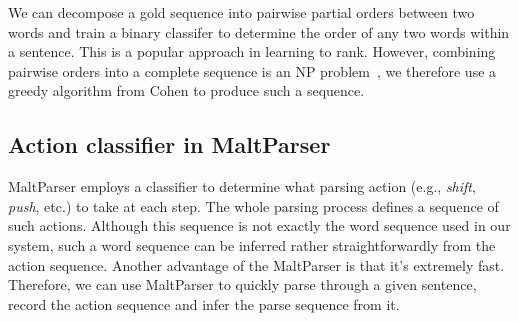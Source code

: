 We can decompose a gold sequence into pairwise partial orders between
two words and train a binary classifer to determine the order of any two
words within a sentence. This is a popular approach in learning to rank.
However, combining pairwise orders into a complete sequence is an NP
problem~\cite{grotschel1984cutting}, we therefore use a greedy algorithm
from Cohen \cite{schapire1998learning} to produce such a sequence.

\subsection{Action classifier in MaltParser}
MaltParser employs a classifier to determine what parsing action (e.g.,
{\em shift}, {\em push}, etc.) to take at each step. The whole parsing
process defines a sequence of such actions. Although this sequence is
not exactly the word sequence used in our system, such a word sequence
can be inferred rather straightforwardly from the action sequence.
Another advantage of
the MaltParser is that it's extremely fast. Therefore, we can use MaltParser
to quickly parse through a given sentence, record the action sequence and
infer the parse sequence from it.

%


%

